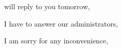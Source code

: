  will reply to you tomorrow,
                                                                                 
																 I have to answer our administrators,
																                                                                                 
																																 I am sorry for any inconvenience,

